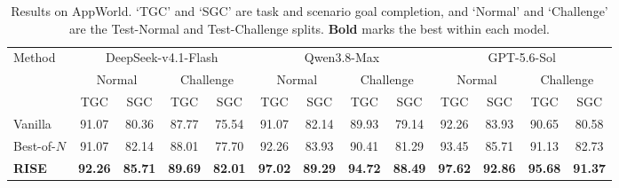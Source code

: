 \documentclass{article}
\newcommand{\method}{RISE\xspace}
\begin{document}
\begin{table}[t]
\centering
\small
\caption{Results on AppWorld. `TGC' and `SGC' are task and scenario goal completion, and `Normal' and `Challenge' are the Test-Normal and Test-Challenge splits. \textbf{Bold} marks the best within each model.}
\label{tab:appworld}
\setlength{\tabcolsep}{2.6pt}
\begin{tabular}{lcccccccccccc}
\toprule
\multirow{3}{*}{Method} & \multicolumn{4}{c}{DeepSeek-v4.1-Flash} & \multicolumn{4}{c}{Qwen3.8-Max} & \multicolumn{4}{c}{GPT-5.6-Sol} \\
\cmidrule(lr){2-5}\cmidrule(lr){6-9}\cmidrule(l){10-13}
 & \multicolumn{2}{c}{Normal} & \multicolumn{2}{c}{Challenge} & \multicolumn{2}{c}{Normal} & \multicolumn{2}{c}{Challenge} & \multicolumn{2}{c}{Normal} & \multicolumn{2}{c}{Challenge} \\
\cmidrule(lr){2-3}\cmidrule(lr){4-5}\cmidrule(lr){6-7}\cmidrule(lr){8-9}\cmidrule(lr){10-11}\cmidrule(l){12-13}
 & TGC & SGC & TGC & SGC & TGC & SGC & TGC & SGC & TGC & SGC & TGC & SGC \\
\midrule
Vanilla & 91.07 & 80.36 & 87.77 & 75.54 & 91.07 & 82.14 & 89.93 & 79.14 & 92.26 & 83.93 & 90.65 & 80.58 \\
\mbox{Best-of-$N$} & 91.07 & 82.14 & 88.01 & 77.70 & 92.26 & 83.93 & 90.41 & 81.29 & 93.45 & 85.71 & 91.13 & 82.73 \\
\textbf{\method} & \textbf{92.26} & \textbf{85.71} & \textbf{89.69} & \textbf{82.01} & \textbf{97.02} & \textbf{89.29} & \textbf{94.72} & \textbf{88.49} & \textbf{97.62} & \textbf{92.86} & \textbf{95.68} & \textbf{91.37} \\
\bottomrule
\end{tabular}
\end{table}
\end{document}
